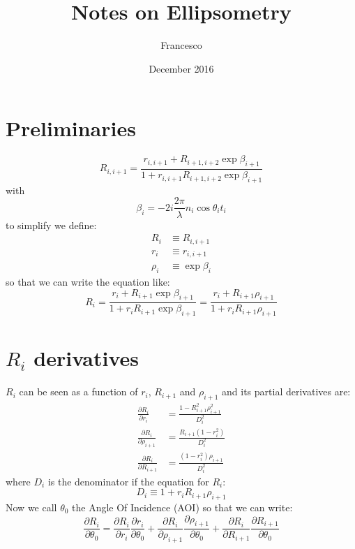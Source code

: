 \documentclass{article}
\title{Notes on Ellipsometry}
\author{Francesco}
\date{December 2016}
\newcommand\pder[2]{\frac{\partial #1}{\partial #2}}
\begin{document}
\section{Preliminaries}
\begin{equation}
    R_{i,i+1} = \frac{r_{i,i+1}+R_{i+1,i+2} \exp \beta_{i+1}}{1+r_{i,i+1} R_{i+1,i+2} \exp\beta_{i+1}}
\end{equation}
with
\begin{equation*}
    \beta_i = -2 i \frac{2 \pi}{\lambda} n_i \cos \theta_i t_i
\end{equation*}
to simplify we define:
\begin{align*}
    R_i & \equiv R_{i,i+1} \\
    r_i & \equiv r_{i,i+1} \\
    \rho_i & \equiv \exp \beta_i
\end{align*}
so that we can write the equation like:
\begin{equation}
    R_i = \frac{r_i + R_{i+1} \exp \beta_{i+1}}{1 + r_i R_{i+1} \exp\beta_{i+1}} = \frac{r_i + R_{i+1} \rho_{i+1}}{1 + r_i R_{i+1} \rho_{i+1}}
\end{equation}
\section{$R_i$ derivatives}
$R_i$ can be seen as a function of $r_i$, $R_{i+1}$ and $\rho_{i+1}$ and its partial derivatives are:
\begin{align}
    \pder{R_i}{r_i} & = \frac{1 - R_{i+1}^2 \rho_{i+1}^2}{D_i^2} \\
    \pder{R_i}{\rho_{i+1}} & = \frac{R_{i+1}\left(1 - r_i^2\right)}{D_i^2} \\
    \pder{R_i}{R_{i+1}} & = \frac{\left(1 - r_i^2\right) \rho_{i+1}}{D_i^2}
\end{align}
where $D_i$ is the denominator if the equation for $R_i$:
\begin{equation}
    D_i \equiv 1 + r_i R_{i+1} \rho_{i+1}
\end{equation}
Now we call $\theta_0$ the Angle Of Incidence (AOI) so that we can write:
\begin{equation}
    \pder{R_i}{\theta_0} = \pder{R_i}{r_i} \pder{r_i}{\theta_0} + \pder{R_i}{\rho_{i+1}} \frac{\partial \rho_{i+1}}{\partial \theta_0} + \pder{R_i}{R_{i+1}} \pder{R_{i+1}}{\theta_0}
\end{equation}
\end{document}
